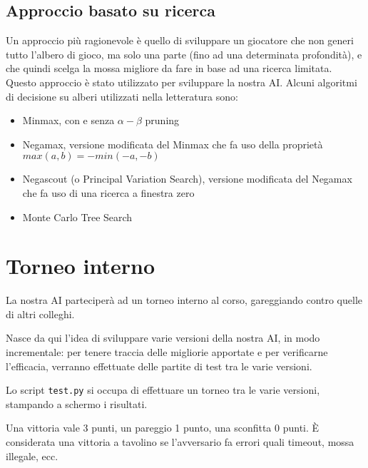 \subsection{Approccio basato su ricerca}

Un approccio più ragionevole è quello di sviluppare un giocatore che non generi tutto l'albero di gioco, ma solo una parte (fino ad una determinata profondità), e che quindi scelga la mossa migliore da fare in base ad una ricerca limitata.
Questo approccio è stato utilizzato per sviluppare la nostra AI.
Alcuni algoritmi di decisione su alberi utilizzati nella letteratura sono:
\begin{itemize}
    \item Minmax, con e senza $\alpha-\beta$ pruning
    \item Negamax, versione modificata del Minmax che fa uso della proprietà $max(a,b) = -min(-a,-b)$
    \item Negascout (o Principal Variation Search), versione modificata del Negamax che fa uso di una ricerca a finestra zero
    \item Monte Carlo Tree Search
\end{itemize}

\section{Torneo interno}

La nostra AI parteciperà ad un torneo interno al corso, gareggiando contro quelle di altri colleghi.

Nasce da qui l'idea di sviluppare varie versioni della nostra AI, in modo incrementale: per tenere traccia delle migliorie apportate e per verificarne l'efficacia, verranno effettuate delle partite di test tra le varie versioni.

Lo script \texttt{test.py} si occupa di effettuare un torneo tra le varie versioni, stampando a schermo i risultati.

Una vittoria vale 3 punti, un pareggio 1 punto, una sconfitta 0 punti. È considerata una vittoria a tavolino se l'avversario fa errori quali timeout, mossa illegale, ecc.

